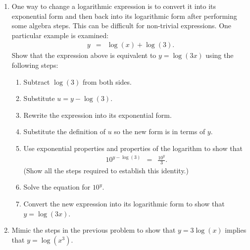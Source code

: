 \begin{enumerate}
\item One way to change a logarithmic expression is to convert it into
  its exponential form and then back into its logarithmic form after
  performing some algebra steps. This can be difficult for non-trivial
  expressions. One particular example is examined:
  \begin{eqnarray*}
    y & = & \log(x) + \log(3).
  \end{eqnarray*}
  Show that the expression above is equivalent to $y=\log(3x)$ using
  the following steps:
  \begin{enumerate}
  \item Subtract $\log(3)$ from both sides.
  \item Substitute $u=y-\log(3)$.
  \item Rewrite the expression into its exponential form.
  \item Substitute the definition of $u$ so the new form is in terms of $y$.
  \item Use exponential properties and properties of the logarithm to show that
    \begin{eqnarray*}
      10^{y-\log(3)} & = & \frac{10^y}{3}.
    \end{eqnarray*}
    (Show all the steps required to establish this identity.)
  \item Solve the equation for $10^y$.
  \item Convert the new expression into its logarithmic form to show
    that $y=\log(3x)$.
  \end{enumerate}

\item Mimic the steps in the previous problem to show that
  $y=3\log(x)$ implies that $y=\log\left(x^3\right)$.

\end{enumerate}

